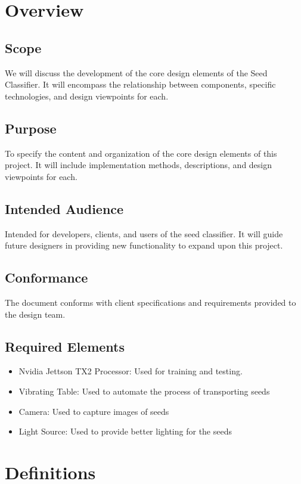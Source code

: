 \documentclass[onecolumn, draftclsnofoot,10pt, compsoc]{IEEEtran}
\begin{document}

\section{Overview}

\subsection{Scope}
We will discuss the development of the core design elements of the Seed Classifier. It will encompass the relationship between components, specific technologies, and design viewpoints for each.

\subsection{Purpose}
To specify the content and organization of the core design elements of this project. It will include implementation methods, descriptions, and design viewpoints for each. 

\subsection{Intended Audience}
Intended for developers, clients, and users of the seed classifier. It will guide future designers in providing new functionality to expand upon this project.

\subsection{Conformance}
The document conforms with client specifications and requirements provided to the design team.

\subsection{Required Elements}
\begin{itemize}
	\item Nvidia Jettson TX2 Processor: Used for training and testing.
	\item Vibrating Table: Used to automate the process of transporting seeds
	\item Camera: Used to capture images of seeds
	\item Light Source: Used to provide better lighting for the seeds
\end{itemize}


\section{Definitions}
\end{document}
